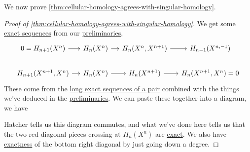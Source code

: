 We now prove \autoref{thm:cellular-homology-agrees-with-singular-homology}.
\begin{proof}[Proof of \autoref{thm:cellular-homology-agrees-with-singular-homology}]\label{pf:thm:cellular-homology-agrees-with-singular-homology}
	We get some \hyperref[def:exact-sequence]{exact sequences} from our \hyperref[lma:lec-34]{preliminaries},
	\[
		\begin{tikzcd}[column sep=small]
			{0=H_{n+1}(X^n)} & {H_n(X^{n})} & {H_n(X^{n}, X^{n+1})} & {H_{n-1}(X^{n,-1})} \\
			{H_{n+1}(X^{n+1}, X^n)} & {H_n(X^n)} & {H_n(X^{n+1})} & {H_n(X^{n+1}, X^n)=0}
			\arrow[from=1-2, to=1-3]
			\arrow[from=1-3, to=1-4]
			\arrow[from=1-1, to=1-2]
			\arrow[from=2-1, to=2-2]
			\arrow[from=2-2, to=2-3]
			\arrow[from=2-3, to=2-4]
		\end{tikzcd}
	\]
	These come from the \hyperref[thm:long-exact-sequence-of-a-pair]{long exact sequences of a pair} combined with the things we've
	deduced in the \hyperref[lma:lec-34]{preliminaries}. We can paste these together into a diagram, we have
	\par
	\par Hatcher\cite{hatcher2002algebraic} tells us this diagram commutes, and what we've done here tells us that the two red diagonal pieces
	crossing at \(H_n(X^n)\) are \hyperref[def:exact]{exact}. We also have \hyperref[def:exact]{exactness} of the bottom right diagonal
	by just going down a degree.


\end{proof}
